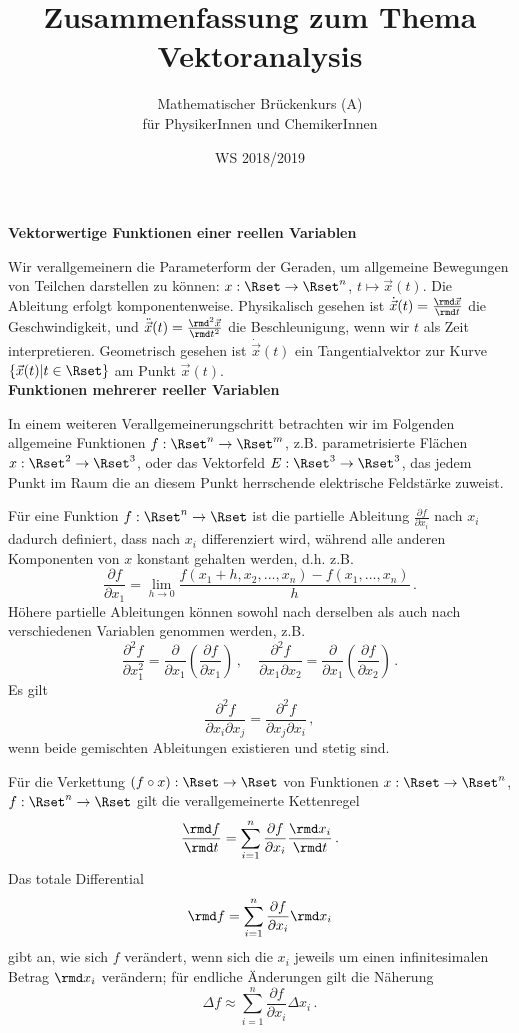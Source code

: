 \documentclass[a4paper,10pt]{article}
\title{Zusammenfassung zum Thema \\ Vektoranalysis}
\author{Mathematischer Brückenkurs (A)\\für PhysikerInnen und ChemikerInnen}
\date{WS 2018/2019}
\begin{document}
\parindent0pt
\maketitle


{\bf Vektorwertige Funktionen einer reellen Variablen}

Wir verallgemeinern die Parameterform der Geraden, um allgemeine
Bewegungen von Teilchen darstellen zu können: $x:\Rset\to\Rset^n$,
$t\mapsto \vec{x}(t)$. Die Ableitung erfolgt komponentenweise.
Physikalisch gesehen ist $\dot{\vec{x}}(t) =\frac{\rmd \vec{x}}{\rmd t}$
die Geschwindigkeit, und $\ddot{\vec{x}}(t) =\frac{\rmd^2 \vec{x}}{\rmd t^2}$
die Beschleunigung, wenn wir $t$ als Zeit interpretieren.
Geometrisch gesehen ist $\dot{\vec{x}}(t)$ ein Tangentialvektor zur
Kurve $\{\vec{x}(t)|t\in\Rset\}$ am Punkt $\vec{x}(t)$.\\


{\bf Funktionen mehrerer reeller Variablen}

In einem weiteren Verallgemeinerungschritt betrachten wir im Folgenden
allgemeine Funktionen $f:\Rset^n\to\Rset^m$, z.B. 
parametrisierte Flächen $x:\Rset^2\to\Rset^3$, oder
das Vektorfeld $E:\Rset^3\to\Rset^3$, das jedem Punkt im Raum die
an diesem Punkt herrschende elektrische Feldstärke zuweist.

Für eine Funktion $f:\Rset^n\to\Rset$ ist die
partielle Ableitung $\frac{\partial f}{\partial x_i}$ nach $x_i$
dadurch definiert, dass nach $x_i$ differenziert wird, während alle
anderen Komponenten von $x$ konstant gehalten werden, d.h. z.B.
\[
\frac{\partial f}{\partial x_1} = \lim\limits_{h\to 0} \frac{f(x_1+h,x_2,\ldots,x_n)-f(x_1,\ldots,x_n)}{h}\,.
\]
Höhere partielle Ableitungen können sowohl nach derselben als auch nach verschiedenen Variablen genommen werden, z.B.
\[
\frac{\partial^2 f}{\partial x_1^2} = \frac{\partial}{\partial x_1}\left(\frac{\partial f}{\partial x_1}\right)\,,~~~~~
\frac{\partial^2 f}{\partial x_1\partial x_2} = \frac{\partial}{\partial x_1}\left(\frac{\partial f}{\partial x_2}\right)\,.
\]
Es gilt
\[
\frac{\partial^2 f}{\partial x_i\partial x_j} = \frac{\partial^2 f}{\partial x_j\partial x_i}\,,
\]
wenn beide gemischten Ableitungen existieren und stetig sind.

Für die Verkettung $(f\circ x):\Rset\to\Rset$ von Funktionen
$x:\Rset\to\Rset^n$, $f:\Rset^n\to\Rset$ gilt die verallgemeinerte
Kettenregel
\[
\frac{\rmd f}{\rmd t}=\sum_{i=1}^n \frac{\partial f}{\partial x_i}\frac{\rmd x_i}{\rmd t}\,.
\]
Das totale Differential
\[
\rmd f = \sum_{i=1}^n \frac{\partial f}{\partial x_i} \rmd x_i
\]
gibt an, wie sich $f$ verändert, wenn sich die $x_i$ jeweils um einen
infinitesimalen Betrag $\rmd x_i$ verändern; für endliche Änderungen
gilt die Näherung
\[
\Delta f \approx \sum_{i=1}^n \frac{\partial f}{\partial x_i} \Delta x_i\,.
\]
\end{document}
